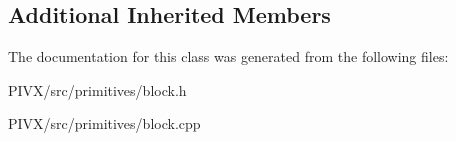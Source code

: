 \subsection*{Additional Inherited Members}


The documentation for this class was generated from the following files\+:\begin{DoxyCompactItemize}
\item 
P\+I\+V\+X/src/primitives/block.\+h\item 
P\+I\+V\+X/src/primitives/block.\+cpp\end{DoxyCompactItemize}
